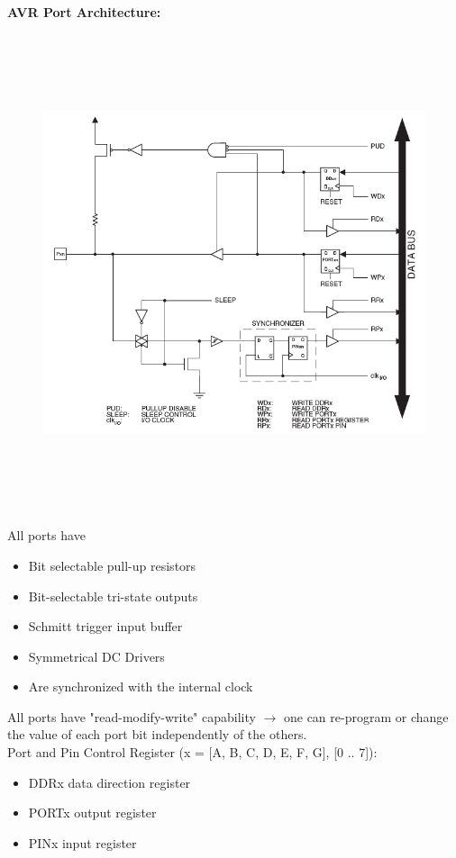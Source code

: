 {\rot\bf AVR Port Architecture:}

    \begin{figure}[h]
    \centering
    \includegraphics[width=15cm, height=14cm]{Images/image52.png}
    \label{fig:Fig }
    \end{figure}

All ports have

\begin{itemize}
\item  Bit selectable pull-up resistors
\item  Bit-selectable tri-state outputs
\item  Schmitt trigger input buffer
\item  Symmetrical DC Drivers
\item  Are synchronized with the internal clock
\end{itemize}

All ports have "read-modify-write" capability $\rightarrow$ one can re-program or change the value of each port bit independently of the others.\\

Port and Pin Control Register (x = [A, B, C, D, E, F, G], [0 .. 7]):

\begin{itemize}
\item  DDRx data direction register
\item  PORTx output register
\item  PINx input register
\end{itemize}

